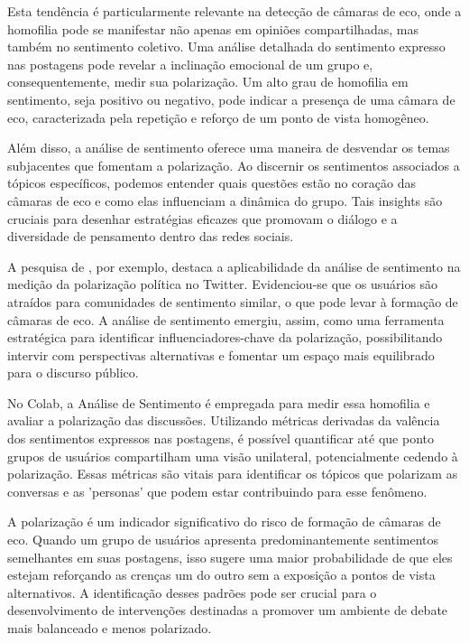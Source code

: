 Esta tendência é particularmente relevante na detecção de câmaras de eco, onde a homofilia pode se manifestar não apenas em opiniões compartilhadas, mas também no sentimento coletivo. Uma análise detalhada do sentimento expresso nas postagens pode revelar a inclinação emocional de um grupo e, consequentemente, medir sua polarização. Um alto grau de homofilia em sentimento, seja positivo ou negativo, pode indicar a presença de uma câmara de eco, caracterizada pela repetição e reforço de um ponto de vista homogêneo.

Além disso, a análise de sentimento oferece uma maneira de desvendar os temas subjacentes que fomentam a polarização. Ao discernir os sentimentos associados a tópicos específicos, podemos entender quais questões estão no coração das câmaras de eco e como elas influenciam a dinâmica do grupo. Tais insights são cruciais para desenhar estratégias eficazes que promovam o diálogo e a diversidade de pensamento dentro das redes sociais.

A pesquisa de , por exemplo, destaca a aplicabilidade da análise de sentimento na medição da polarização política no Twitter. Evidenciou-se que os usuários são atraídos para comunidades de sentimento similar, o que pode levar à formação de câmaras de eco. A análise de sentimento emergiu, assim, como uma ferramenta estratégica para identificar influenciadores-chave da polarização, possibilitando intervir com perspectivas alternativas e fomentar um espaço mais equilibrado para o discurso público.

No Colab, a Análise de Sentimento é empregada para medir essa homofilia e avaliar a polarização das discussões. Utilizando métricas derivadas da valência dos sentimentos expressos nas postagens, é possível quantificar até que ponto grupos de usuários compartilham uma visão unilateral, potencialmente cedendo à polarização. Essas métricas são vitais para identificar os tópicos que polarizam as conversas e as 'personas' que podem estar contribuindo para esse fenômeno.

A polarização é um indicador significativo do risco de formação de câmaras de eco. Quando um grupo de usuários apresenta predominantemente sentimentos semelhantes em suas postagens, isso sugere uma maior probabilidade de que eles estejam reforçando as crenças um do outro sem a exposição a pontos de vista alternativos. A identificação desses padrões pode ser crucial para o desenvolvimento de intervenções destinadas a promover um ambiente de debate mais balanceado e menos polarizado.

